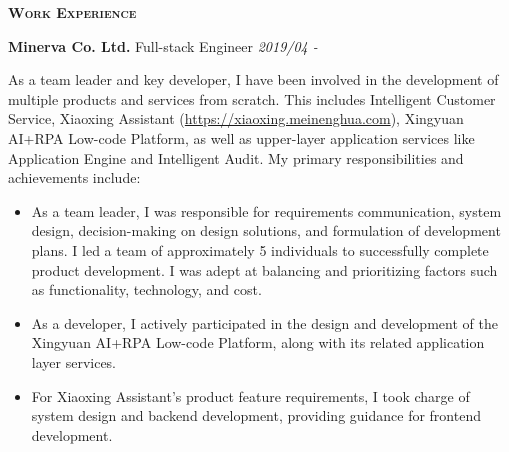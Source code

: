 \documentclass[a4paper]{article}
\newenvironment{changemargin}[2]{%
  \begin{list}{}{%
    \setlength{\topsep}{0pt}%
    \setlength{\leftmargin}{#1}%
    \setlength{\rightmargin}{#2}%
    \setlength{\listparindent}{\parindent}%
    \setlength{\itemindent}{\parindent}%
    \setlength{\parsep}{\parskip}%
  }%
  \item[]}{\end{list}
}
\newcommand{\lineover}{
	\begin{changemargin}{-0.05in}{-0.05in}
		\vspace*{-8pt}
		\hrulefill \\
		\vspace*{-2pt}
	\end{changemargin}
}
\newcommand{\header}[1]{
	\begin{changemargin}{-0.5in}{-0.5in}
		\scshape{\large \textbf{#1}}\\
	\end{changemargin}
}
\newenvironment{body} {
	\vspace*{-16pt}
	\begin{changemargin}{-0.5in}{-0.5in}
  }
	{\end{changemargin}
}
\begin{document}
\header{Work Experience}
\begin{body}
	\vspace{16pt}
	\textbf{Minerva Co. Ltd.} \hfill Full-stack Engineer \emph{2019/04 - } \\

	\begin{justify}
		As a team leader and key developer, I have been involved in the development of multiple products and services from scratch. This includes Intelligent Customer Service, Xiaoxing Assistant (\url{https://xiaoxing.meinenghua.com}), Xingyuan AI+RPA Low-code Platform, as well as upper-layer application services like Application Engine and Intelligent Audit. My primary responsibilities and achievements include:
	\end{justify}

	\smallskip

	\vspace*{-8pt}
	\begin{itemize} \itemsep -0pt  %
		\item \begin{justify} As a team leader, I was responsible for requirements communication, system design, decision-making on design solutions, and formulation of development plans. I led a team of approximately 5 individuals to successfully complete product development. I was adept at balancing and prioritizing factors such as functionality, technology, and cost.\end{justify}
	\end{itemize}

	\vspace*{-8pt}
	\begin{itemize} \itemsep -0pt  %
		\item \begin{justify} As a developer, I actively participated in the design and development of the Xingyuan AI+RPA Low-code Platform, along with its related application layer services.
		\end{justify}
	\end{itemize}

	\vspace*{-8pt}
	\begin{itemize} \itemsep -0pt  %
		\item \begin{justify} For Xiaoxing Assistant's product feature requirements, I took charge of system design and backend development, providing guidance for frontend development. \end{justify} 
	\end{itemize}


\end{body}
\end{document}
